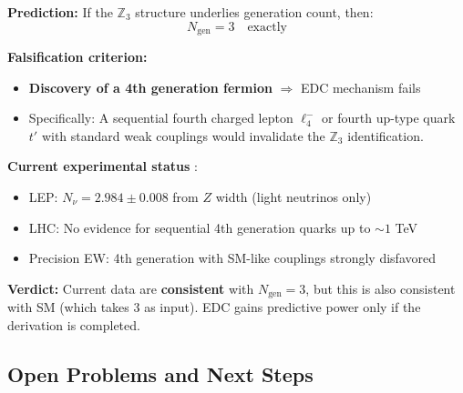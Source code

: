 \begin{tcolorbox}[edcCanonical, title=\textbf{Falsifiability Statement}]
\textbf{Prediction:} If the $\mathbb{Z}_3$ structure underlies generation count,
then:
\begin{equation}
    N_{\text{gen}} = 3 \quad \text{exactly}
    \label{eq:ch5_prediction}
\end{equation}

\textbf{Falsification criterion:}
\begin{itemize}[nosep]
    \item \textbf{Discovery of a 4th generation fermion} $\Longrightarrow$ EDC mechanism fails
    \item Specifically: A sequential fourth charged lepton $\ell_4^-$ or fourth
          up-type quark $t'$ with standard weak couplings would invalidate the
          $\mathbb{Z}_3$ identification.
\end{itemize}

\textbf{Current experimental status} \tagBL{}:
\begin{itemize}[nosep]
    \item LEP: $N_\nu = 2.984 \pm 0.008$ from $Z$ width (light neutrinos only)
    \item LHC: No evidence for sequential 4th generation quarks up to $\sim 1$ TeV
    \item Precision EW: 4th generation with SM-like couplings strongly disfavored
\end{itemize}

\textbf{Verdict:} Current data are \textbf{consistent} with $N_{\text{gen}} = 3$,
but this is also consistent with SM (which takes 3 as input). EDC gains predictive
power only if the derivation is completed.
\end{tcolorbox}

\subsection{Open Problems and Next Steps}
\label{sec:ch5_open}

